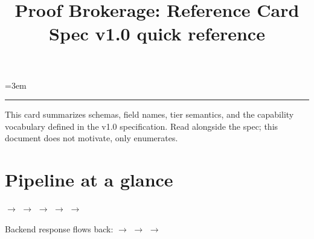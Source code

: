 \documentclass[10pt,letterpaper]{article}
\title{\vspace{-1.5cm}\textbf{Proof Brokerage: Reference Card}\\[0.2em]
       \large Spec v1.0 quick reference}
\author{}
\date{}
\begin{document}
\maketitle
\vspace{-2em}

\sloppy
\emergencystretch=3em

\hrule
\vspace{0.5em}

\noindent
This card summarizes schemas, field names, tier semantics, and the
capability vocabulary defined in the v1.0 specification. Read alongside
the spec; this document does not motivate, only enumerates.

\section{Pipeline at a glance}

\begin{center}
\small
{} $\to$  $\to$  $\to$  $\to$  $\to$ 
\end{center}

\noindent
Backend response flows back:  $\to$  $\to$  $\to$ 
\end{document}

